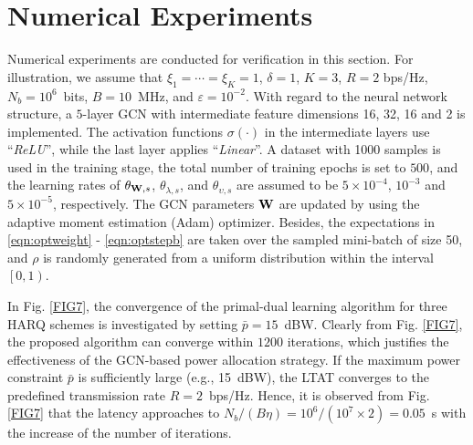 \documentclass[conference]{IEEEtran}
\begin{document}
\section{Numerical Experiments}\label{sec:EXPERIMENTS}
Numerical experiments are conducted for verification in this section. %
For illustration, we assume that ${\xi _1} =  \cdots =  {\xi _K} = 1$, $\delta  = 1$, $K=3$, $R = 2$ bps/Hz, $N_b=10^6$~bits, $B=10$~MHz, and $\varepsilon = 10^{-2}$. With regard to the neural network structure, a $5$-layer GCN with intermediate feature dimensions 16, 32, 16 and 2 is implemented. The activation functions $\sigma ( \cdot )$ in the intermediate layers use ``\emph{ReLU}'', while the last layer applies ``\emph{Linear}''. A dataset with 1000 samples is used in the training stage, the total number of training epochs is set to $500$, and the learning rates of ${\theta _{{\bf{W}},s}}$, ${\theta _{\lambda,s}}$, and ${\theta _{\upsilon,s}}$ are assumed to be $5 \times {10^{ - 4}}$, $10^{-3}$ and $5 \times {10^{ - 5}}$, respectively. The GCN parameters $\bf W$ are updated by using the adaptive moment estimation (Adam) optimizer. Besides, the expectations in \eqref{eqn:optweight} - \eqref{eqn:optstepb} are taken over the sampled mini-batch of size 50, and $\rho $ is randomly generated from a uniform distribution within the interval $\left[ {0,1} \right)$. %

In Fig. \ref{FIG7}, the convergence of the primal-dual learning algorithm for three HARQ schemes is investigated by setting $\bar p = 15$~dBW. Clearly from Fig. \ref{FIG7}, the proposed algorithm can converge within $1200$ iterations, which justifies the effectiveness of the GCN-based power allocation strategy. If the maximum power constraint $\bar p$ is sufficiently large (e.g., 15~dBW), the LTAT converges to the predefined transmission rate $R=2$~bps/Hz. Hence, it is observed from Fig. \ref{FIG7} that the latency approaches to $N_b/(B\eta)=10^6/(10^7\times 2)=0.05$~s with the increase of the number of iterations.

\end{document}
